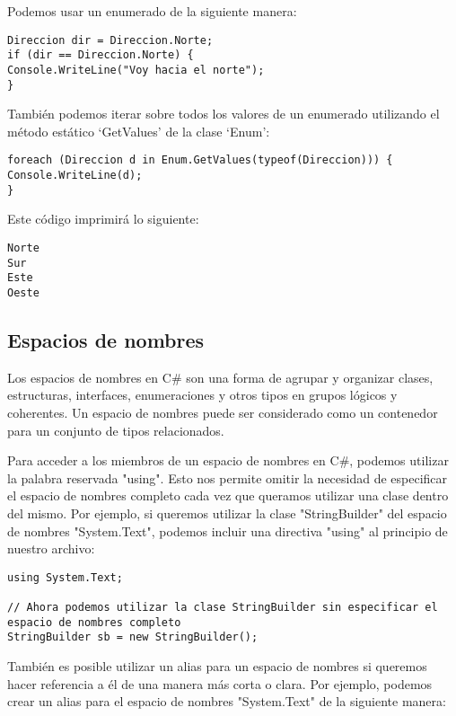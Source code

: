 \documentclass[executivepaper]{article}
\begin{document}
Podemos usar un enumerado de la siguiente manera:

\begin{lstlisting}
Direccion dir = Direccion.Norte;
if (dir == Direccion.Norte) {
Console.WriteLine("Voy hacia el norte");
}
\end{lstlisting}

También podemos iterar sobre todos los valores de un enumerado utilizando el método estático \enquote*{GetValues} de la clase \enquote*{Enum}:

\begin{lstlisting}
foreach (Direccion d in Enum.GetValues(typeof(Direccion))) {
Console.WriteLine(d);
}
\end{lstlisting}

Este código imprimirá lo siguiente:

\begin{lstlisting}
Norte
Sur
Este
Oeste
\end{lstlisting}

\subsection{Espacios de nombres}

Los espacios de nombres en C\# son una forma de agrupar y organizar clases, estructuras, interfaces, enumeraciones y otros tipos en grupos lógicos y coherentes. Un espacio de nombres puede ser considerado como un contenedor para un conjunto de tipos relacionados.

Para acceder a los miembros de un espacio de nombres en C\#, podemos utilizar la palabra reservada "using". Esto nos permite omitir la necesidad de especificar el espacio de nombres completo cada vez que queramos utilizar una clase dentro del mismo. Por ejemplo, si queremos utilizar la clase "StringBuilder" del espacio de nombres "System.Text", podemos incluir una directiva "using" al principio de nuestro archivo:

\begin{lstlisting}
using System.Text;

// Ahora podemos utilizar la clase StringBuilder sin especificar el espacio de nombres completo
StringBuilder sb = new StringBuilder();
\end{lstlisting}

También es posible utilizar un alias para un espacio de nombres si queremos hacer referencia a él de una manera más corta o clara. Por ejemplo, podemos crear un alias para el espacio de nombres "System.Text" de la siguiente manera:
\end{document}
